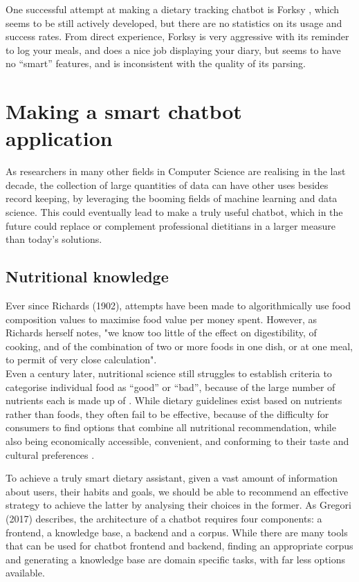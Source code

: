One successful attempt at making a dietary tracking chatbot is Forksy \cite{forksywebsite}, which seems to be still actively developed, but there are no statistics on its usage and success rates. From direct experience, Forksy is very aggressive with its reminder to log your meals, and does a nice job displaying your diary, but seems to have no ``smart'' features, and is inconsistent with the quality of its parsing.
\section{Making a smart chatbot application}
As researchers in many other fields in Computer Science are realising in the last decade, the collection of large quantities of data can have other uses besides record keeping, by leveraging the booming fields of machine learning and data science. This could eventually lead to make a truly useful chatbot, which in the future could replace or complement professional dietitians in a larger measure than today's solutions. 
\subsection{Nutritional knowledge}
Ever since Richards (1902)\cite{Richards1902a}, attempts have been made to algorithmically use food composition values to maximise food value per money spent. However, as Richards herself notes, "we know too little of the effect on digestibility, of cooking, and of the combination of two or more foods in one dish, or at one meal, to permit of very close calculation". \\
Even a century later, nutritional science still struggles to establish criteria to categorise individual food as ``good'' or ``bad'', because of the large number of nutrients each is made up of \cite{USDAFoodandNutritionService2007}. While dietary guidelines exist based on nutrients rather than foods, they often fail to be effective, because of the difficulty for consumers to find options that combine all nutritional recommendation, while also being economically accessible, convenient, and conforming to their taste and cultural preferences \cite{Green2015}. 

To achieve a truly smart dietary assistant, given a vast amount of information about users, their habits and goals, we should be able to recommend an effective strategy to achieve the latter by analysing their choices in the former. As Gregori (2017)\cite{Gregori} describes, the architecture of a chatbot requires four components: a frontend, a knowledge base, a backend and a corpus. While there are many tools that can be used for chatbot frontend and backend, finding an appropriate corpus and generating a knowledge base are domain specific tasks, with far less options available. 

